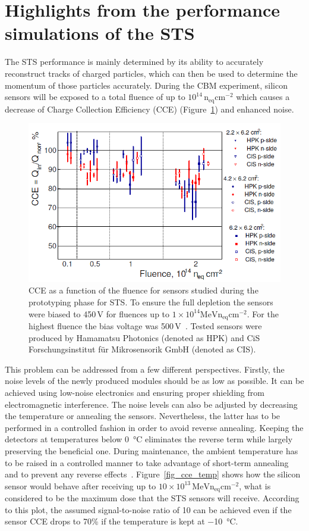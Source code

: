 \section{Highlights from the performance simulations of the STS}
The \gls{STS} performance is mainly determined by its ability to accurately reconstruct tracks of charged particles, which can then be used to determine the momentum of those particles accurately. During the \gls{CBM} experiment, silicon sensors will be exposed to a total fluence of up to $10^{14}\,\mathrm{n_{eq}cm^{-2}}$ which causes a decrease of Charge Collection Efficiency (CCE) (Figure~\ref{fig_cce}) and enhanced noise. 

\begin{figure}[!h]
\centering
\includegraphics[width=0.8\columnwidth]{Chapter2/images/CCE.png}
\caption{CCE as a function of the fluence for sensors studied during the prototyping phase for \gls{STS}. To ensure the full depletion the sensors were biased to 450\,V for fluences up to $1\times10^{14}\mathrm{MeV n_{eq}cm^{-2}}$. For the highest fluence the bias voltage was 500\,V~\cite{Momot:2019lnx}. Tested sensors were produced by Hamamatsu Photonics (denoted as HPK) and CiS Forschungsinstitut für Mikrosensorik GmbH (denoted as CIS).} 
\label{fig_cce}
\end{figure}

This problem can be addressed from a few different perspectives. Firstly, the noise levels of the newly produced modules should be as low as possible. It can be achieved using low-noise electronics and ensuring proper shielding from electromagnetic interference. The noise levels can also be adjusted by decreasing the temperature or annealing the sensors. Nevertheless, the latter has to be performed in a controlled fashion in order to avoid reverse annealing. Keeping the detectors at temperatures below \SI{0}{\celsius} eliminates the reverse term while largely preserving the beneficial one. During maintenance, the ambient temperature has to be raised in a controlled manner to take advantage of short-term annealing and to prevent any reverse effects~\cite{Hartmann:2017gzy}. Figure~\ref{fig_cce_temp} shows how the silicon sensor would behave after receiving up to $10\times10^{13}\,\mathrm{MeV n_{eq}cm^{-2}}$, what is considered to be the maximum dose that the \gls{STS} sensors will receive. According to this plot, the assumed signal-to-noise ratio of 10 can be achieved even if the sensor \gls{CCE} drops to 70\% if the temperature is kept at \SI{-10}{\celsius}.

